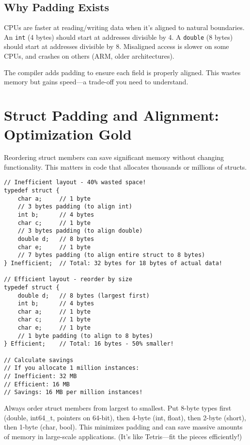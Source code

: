 \subsection{Why Padding Exists}

CPUs are faster at reading/writing data when it's aligned to natural boundaries. An \texttt{int} (4 bytes) should start at addresses divisible by 4. A \texttt{double} (8 bytes) should start at addresses divisible by 8. Misaligned access is slower on some CPUs, and crashes on others (ARM, older architectures).

The compiler adds padding to ensure each field is properly aligned. This wastes memory but gains speed---a trade-off you need to understand.

\section{Struct Padding and Alignment: Optimization Gold}

Reordering struct members can save significant memory without changing functionality. This matters in code that allocates thousands or millions of structs.

\begin{lstlisting}
// Inefficient layout - 40% wasted space!
typedef struct {
    char a;     // 1 byte
    // 3 bytes padding (to align int)
    int b;      // 4 bytes
    char c;     // 1 byte
    // 3 bytes padding (to align double)
    double d;   // 8 bytes
    char e;     // 1 byte
    // 7 bytes padding (to align entire struct to 8 bytes)
} Inefficient;  // Total: 32 bytes for 18 bytes of actual data!

// Efficient layout - reorder by size
typedef struct {
    double d;   // 8 bytes (largest first)
    int b;      // 4 bytes
    char a;     // 1 byte
    char c;     // 1 byte
    char e;     // 1 byte
    // 1 byte padding (to align to 8 bytes)
} Efficient;    // Total: 16 bytes - 50% smaller!

// Calculate savings
// If you allocate 1 million instances:
// Inefficient: 32 MB
// Efficient: 16 MB
// Savings: 16 MB per million instances!
\end{lstlisting}

\begin{tipbox}
Always order struct members from largest to smallest. Put 8-byte types first (double, int64\_t, pointers on 64-bit), then 4-byte (int, float), then 2-byte (short), then 1-byte (char, bool). This minimizes padding and can save massive amounts of memory in large-scale applications. (It's like Tetris---fit the pieces efficiently!)
\end{tipbox}

